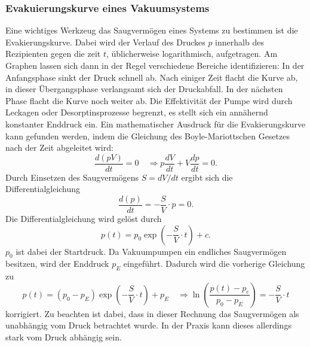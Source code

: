 \subsubsection{Evakuierungskurve eines Vakuumsystems}
Eine wichtiges Werkzeug das Saugvermögen eines Systems zu bestimmen ist die Evakierungskurve. Dabei wird der Verlauf des Druckes $p$ innerhalb des Rezipienten
gegen die zeit $t$, üblicherweise logarithmisch, aufgetragen. Am Graphen lassen sich dann in der Regel verschiedene Bereiche identifizieren:
In der Anfangsphase sinkt der Druck schnell ab. Nach einiger Zeit flacht die Kurve ab, in dieser Übergangsphase verlangsamt sich der Druckabfall.
In der nächsten Phase flacht die Kurve noch weiter ab. Die Effektivität der Pumpe wird durch Leckagen oder Desorptinsprozesse begrenzt, es stellt sich ein annähernd konstanter Enddruck ein.
Ein mathematischer Ausdruck für die Evakierungskurve kann gefunden werden, indem die Gleichung des Boyle-Mariottschen Gesetzes nach der Zeit abgeleitet wird:
\begin{equation}
    \frac{d(pV)}{dt} = 0  \quad \Rightarrow  p \frac{dV}{dt}  + V \frac{dp}{dt} = 0 .
\end{equation}
Durch Einsetzen des Saugvermögens $S = dV/dt$ ergibt sich die Differentialgleichung
\begin{equation}
    \frac{d(p)}{dt} = - \frac{S}{V} \cdot p = 0 .
\end{equation}
Die Differentialgleichung wird gelöst durch
\begin{equation}
    p(t) = p_0 \exp\left(- \frac{S}{V} \cdot t \right) + c.
\end{equation}
$p_0$ ist dabei der Startdruck. Da Vakuumpumpen ein endliches Saugvermögen besitzen, wird der Enddruck $p_E$ eingeführt.
Dadurch wird die vorherige Gleichung zu
\begin{equation}
    \label{eq:evakuierung}
    p(t) = (p_0 - p_E) \exp\left(- \frac{S}{V} \cdot t \right) + p_E \quad \Rightarrow \ln \left(\frac{p(t) - p_e}{p_0 - p_E}\right) = - \frac{S}{V} \cdot t
\end{equation}
korrigiert. Zu beachten ist dabei, dass in dieser Rechnung das Saugvermögen als unabhängig vom Druck betrachtet wurde.
In der Praxis kann dieses allerdings stark vom Druck abhängig sein.\cite{V070_glossar}

